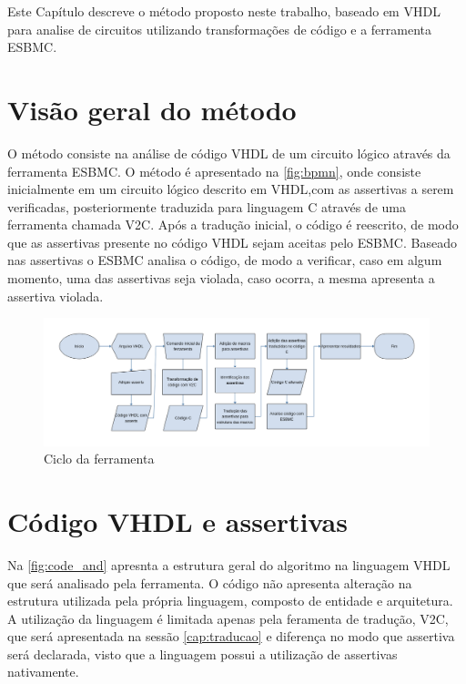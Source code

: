 \label{chapter:metodo}
Este Capítulo descreve o método proposto neste trabalho, baseado em VHDL para analise de circuitos utilizando transformações de código e a ferramenta ESBMC.

\section{Visão geral do método}
O método consiste na análise de código VHDL de um circuito lógico através da ferramenta ESBMC. O método é apresentado na \autoref{fig:bpmn}, onde consiste inicialmente em um circuito lógico descrito em VHDL,com as assertivas a serem verificadas, posteriormente traduzida para linguagem C através de uma ferramenta chamada V2C. Após a tradução inicial, o código é reescrito, de modo que as assertivas presente no código VHDL sejam aceitas pelo ESBMC. Baseado nas assertivas o ESBMC analisa o código, de modo a verificar, caso em algum momento, uma das assertivas seja violada, caso ocorra, a mesma apresenta a assertiva violada.

\begin{figure}[htb]
	\begin{center}
    \caption{\label{fig:bpmn}Ciclo da ferramenta}
	\includegraphics[scale=0.4]{Figuras/bpmn.png}
	\end{center}
\end{figure}

\section{\label{cap:vhdl_assertivas}Código VHDL e assertivas}
\par
Na \autoref{fig:code_and} apresnta a estrutura geral do algoritmo na linguagem VHDL que será analisado pela ferramenta. O código não apresenta alteração na estrutura utilizada pela própria linguagem, composto de entidade e arquitetura. A utilização da linguagem é limitada apenas pela feramenta de tradução, V2C, que será apresentada na sessão \autoref{cap:traducao} e diferença no modo que assertiva será declarada, visto que a linguagem possui a utilização de assertivas nativamente.

